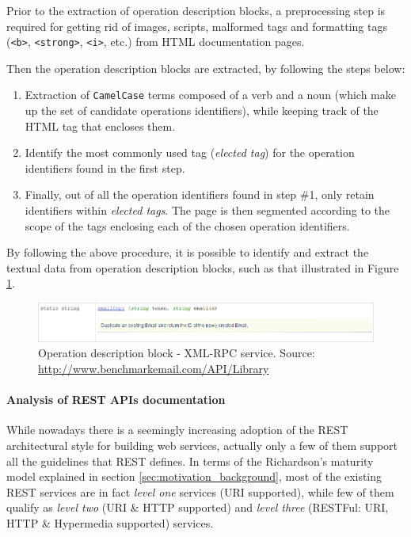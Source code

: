 Prior to the extraction of operation description blocks, a preprocessing step is required for getting rid of images, scripts, malformed tags and formatting tags (\texttt{<b>}, \texttt{<strong>}, \texttt{<i>}, etc.) from HTML documentation pages.

Then the operation description blocks are extracted, by following the steps below: 

\begin{enumerate}
 \item Extraction of \texttt{CamelCase} terms composed of a verb and a noun (which make up the set of candidate operations identifiers), while keeping track of the HTML tag that encloses them.
 \item Identify the most commonly used tag (\emph{elected tag}) for the operation identifiers found in the first step.
 \item Finally, out of all the operation identifiers found in step \#1, only retain identifiers within \emph{elected tags}. The page is then segmented according to the scope of the tags enclosing each of the chosen operation identifiers.
\end{enumerate}

By following the above procedure, it is possible to identify and extract the textual data from operation description blocks, such as that illustrated in Figure \ref{xml-rpc-op-block}.

\begin{figure}
 \includegraphics[scale=0.5]{images/xml-rpc-operation-block}

 \caption{Operation description block - XML-RPC service. {\scriptsize Source:
 \protect\href{http://www.benchmarkemail.com/API/Library}{http://www.benchmarkemail.com/API/Library}}}
 \label{xml-rpc-op-block}
\end{figure}

\paragraph{Analysis of REST APIs documentation}
\label{parag:rest}
While nowadays there is a seemingly increasing adoption of the REST architectural style for building web services, actually only a few of them support all the guidelines that REST defines. In terms of the Richardson's maturity model explained in section \ref{sec:motivation_background}, most of the existing REST services are in fact \emph{level one }services\emph{ }(URI supported), while few of them qualify as \emph{level two }(URI \& HTTP supported) and \emph{level three} (RESTFul: URI, HTTP \& Hypermedia supported) services.

